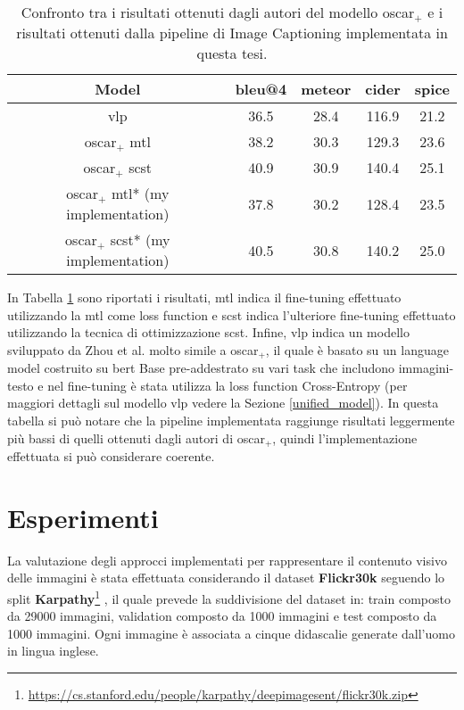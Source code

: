 \begin{table}[H]
\footnotesize
\begin{center}
\begin{tabular}{||c c c c c||} 
 \hline
 \textbf{Model} & \textbf{\acrshort{bleu}@4} & \textbf{\acrshort{meteor}} & \textbf{\acrshort{cider}} & \textbf{\acrshort{spice}}\\ [0.5ex] 
 \hline\hline
 \acrshort{vlp} \cite{zhou2020unified} & 36.5 & 28.4 & 116.9 & 21.2\\
 \hline
 \acrshort{oscar}$_+$ \acrshort{mtl} \cite{li2020oscar, zhang2021vinvl} & 38.2 & 30.3 & 129.3 & 23.6\\
 \hline
 \acrshort{oscar}$_+$ \acrshort{scst} \cite{li2020oscar, zhang2021vinvl} & 40.9 & 30.9 & 140.4 & 25.1\\
 \hline
 \acrshort{oscar}$_+$ \acrshort{mtl}* (my implementation) & 37.8 & 30.2 & 128.4 & 23.5\\
 \hline
 \acrshort{oscar}$_+$ \acrshort{scst}* (my implementation) & 40.5 & 30.8 & 140.2 & 25.0\\
 \hline

\end{tabular}
\caption{Confronto tra i risultati ottenuti dagli autori del modello \acrshort{oscar}$_+$ e i risultati ottenuti dalla pipeline di Image Captioning implementata in questa tesi.}
\label{table:2}
\end{center}
\end{table}

In Tabella \ref{table:2} sono riportati i risultati, \acrshort{mtl} indica il fine-tuning effettuato utilizzando la \acrlong{mtl} come loss function e \acrshort{scst} indica l'ulteriore fine-tuning effettuato utilizzando la tecnica di ottimizzazione \acrlong{scst}.
Infine, \acrshort{vlp} indica un modello sviluppato da Zhou et al. \cite{zhou2020unified} molto simile a \acrshort{oscar}$_+$, il quale è basato su un language model costruito su \acrshort{bert} Base pre-addestrato su vari task che includono immagini-testo e nel fine-tuning è stata utilizza la loss function Cross-Entropy (per maggiori dettagli sul modello \acrshort{vlp} vedere la Sezione \ref{unified_model}).
In questa tabella si può notare che la pipeline implementata raggiunge risultati leggermente più bassi di quelli ottenuti dagli autori di \acrshort{oscar}$_+$, quindi l'implementazione effettuata si può considerare coerente.


\section{Esperimenti}
La valutazione degli approcci implementati per rappresentare il contenuto visivo delle immagini è stata effettuata considerando il dataset \textbf{Flickr30k} seguendo lo split \textbf{Karpathy}\footnote{\url{https://cs.stanford.edu/people/karpathy/deepimagesent/flickr30k.zip}} \cite{karpathy2015deep}, il quale prevede la suddivisione del dataset in: train composto da 29000 immagini, validation composto da 1000 immagini e test composto da 1000 immagini. Ogni immagine è associata a cinque didascalie generate dall'uomo in lingua inglese.




